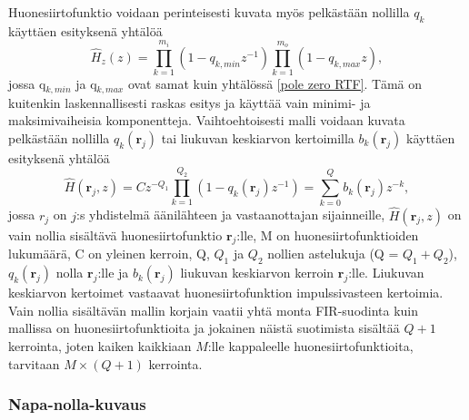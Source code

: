 \documentclass[finnish,12pt]{article}
\begin{document}
Huonesiirtofunktio voidaan perinteisesti kuvata myös pelkästään nollilla $q_k$  käyttäen esityksenä yhtälöä \begin{equation}
\hat{H}_z(z) = \prod\limits_{k=1}^{m_i} (1-q_{k,min} z^{-1}) \prod\limits_{k=1}^{m_o} (1-q_{k, max} z), 
\end{equation} jossa q$_{k, min}$ ja q$_{k, max}$ ovat samat kuin yhtälössä \eqref{pole zero RTF}. Tämä on kuitenkin laskennallisesti raskas esitys ja käyttää vain minimi- ja maksimivaiheisia komponentteja. Vaihtoehtoisesti malli voidaan kuvata pelkästään nollilla $q_k(\textbf{r}_j)$ tai liukuvan keskiarvon kertoimilla $b_k(\textbf{r}_j)$ käyttäen esityksenä yhtälöä \begin{equation}
\hat{H}(\textbf{r}_j,z) = C z^{-Q_1} \prod\limits_{k=1}^{Q_2} \left( 1-q_k(\textbf{r}_j) z^{-1} \right) = \sum\limits_{k=0}^Q b_k(\textbf{r}_j) z^{-k},
\end{equation} jossa $r_j$ on $j$:s yhdistelmä äänilähteen ja vastaanottajan sijainneille, $\hat{H}(\textbf{r}_j,z)$ on vain nollia sisältävä huonesiirtofunktio $\textbf{r}_j$:lle, M on huonesiirtofunktioiden lukumäärä, C on yleinen kerroin, Q, $Q_1$ ja $Q_2$ nollien astelukuja (Q = $Q_1 + Q_2$), $q_k(\textbf{r}_j)$ nolla $\textbf{r}_j$:lle ja $b_k(\textbf{r}_j)$ liukuvan keskiarvon kerroin $\textbf{r}_j$:lle. Liukuvan keskiarvon kertoimet vastaavat huonesiirtofunktion impulssivasteen kertoimia. Vain nollia sisältävän mallin korjain vaatii yhtä monta FIR-suodinta kuin mallissa on huonesiirtofunktioita ja jokainen näistä suotimista sisältää $Q + 1$ kerrointa, joten kaiken kaikkiaan $M$:lle kappaleelle huonesiirtofunktioita, tarvitaan $M \times (Q+1)$ kerrointa. \cite{YHaneda1994}

\subsubsection{Napa-nolla-kuvaus}
\end{document}
